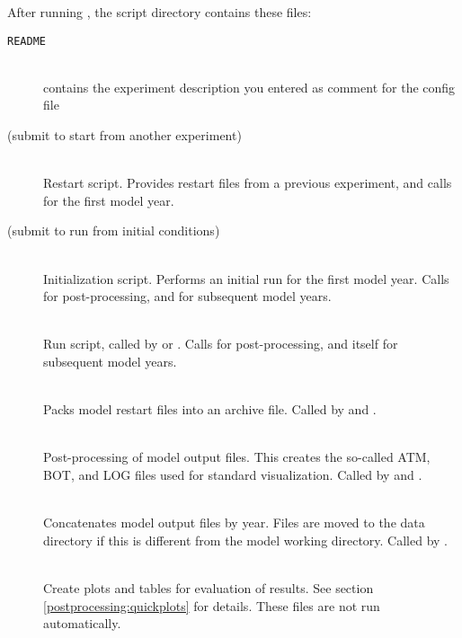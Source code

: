 After running , the script directory contains these files:
%
\begin{description}
\item[{\texttt{README}}]\leavevmode\\
contains the experiment description you entered as comment for the config file

\item[
      (submit to start from another experiment)]\leavevmode\\
Restart script. Provides restart files from a previous experiment, and calls
 for the first model year.

\item[
      (submit to run from initial conditions)]\leavevmode\\
Initialization script. Performs an initial run for the first model year. Calls
 for post-processing, and
 for subsequent model years.

\item[]\leavevmode\\ 
Run script, called by  or
. Calls
 for post-processing, and itself for
subsequent model years.

\item[]\leavevmode\\ 
Packs model restart files into an archive file. Called by
 and
.

\item[]\leavevmode\\ 
Post-processing of model output files. This creates the so-called ATM, BOT, and
LOG files used for \echam{} standard visualization. Called by
 and
.

\item[]\leavevmode\\
Concatenates model output files by year. Files are moved to the data
directory if this is different from the model working directory. Called by
.

\item[]
\leavevmode\\
Create plots and tables for evaluation of results. See section
\ref{postprocessing:quickplots} for details. These files are not run
automatically.

\end{description}


